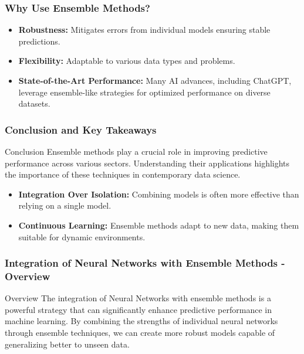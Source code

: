 \documentclass[aspectratio=169]{beamer}
\begin{document}
\begin{frame}[fragile]
    \frametitle{Why Use Ensemble Methods?}
    \begin{itemize}
        \item \textbf{Robustness:} Mitigates errors from individual models ensuring stable predictions.
        \item \textbf{Flexibility:} Adaptable to various data types and problems.
        \item \textbf{State-of-the-Art Performance:} Many AI advances, including ChatGPT, leverage ensemble-like strategies for optimized performance on diverse datasets.
    \end{itemize}
\end{frame}

\begin{frame}[fragile]
    \frametitle{Conclusion and Key Takeaways}
    \begin{block}{Conclusion}
        Ensemble methods play a crucial role in improving predictive performance across various sectors. Understanding their applications highlights the importance of these techniques in contemporary data science.
    \end{block}
    \begin{itemize}
        \item \textbf{Integration Over Isolation:} Combining models is often more effective than relying on a single model.
        \item \textbf{Continuous Learning:} Ensemble methods adapt to new data, making them suitable for dynamic environments.
    \end{itemize}
\end{frame}

\begin{frame}[fragile]
    \frametitle{Integration of Neural Networks with Ensemble Methods - Overview}
    \begin{block}{Overview}
        The integration of Neural Networks with ensemble methods is a powerful strategy that can significantly enhance predictive performance in machine learning. By combining the strengths of individual neural networks through ensemble techniques, we can create more robust models capable of generalizing better to unseen data.
    \end{block}
\end{frame}
\end{document}
